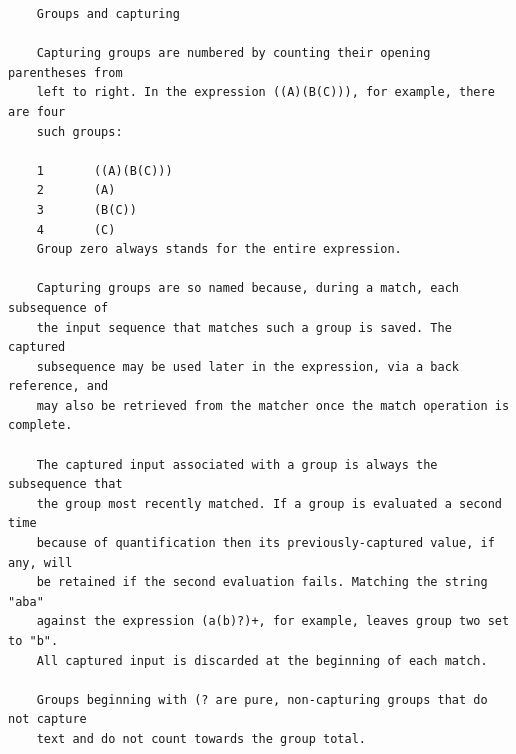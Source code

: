     \begin{verbatim}
    Groups and capturing

    Capturing groups are numbered by counting their opening parentheses from
    left to right. In the expression ((A)(B(C))), for example, there are four
    such groups:

    1    	((A)(B(C)))
    2    	(A)
    3    	(B(C))
    4    	(C)
    Group zero always stands for the entire expression.

    Capturing groups are so named because, during a match, each subsequence of
    the input sequence that matches such a group is saved. The captured
    subsequence may be used later in the expression, via a back reference, and
    may also be retrieved from the matcher once the match operation is complete.

    The captured input associated with a group is always the subsequence that
    the group most recently matched. If a group is evaluated a second time
    because of quantification then its previously-captured value, if any, will
    be retained if the second evaluation fails. Matching the string "aba"
    against the expression (a(b)?)+, for example, leaves group two set to "b".
    All captured input is discarded at the beginning of each match.

    Groups beginning with (? are pure, non-capturing groups that do not capture
    text and do not count towards the group total.
    \end{verbatim}

